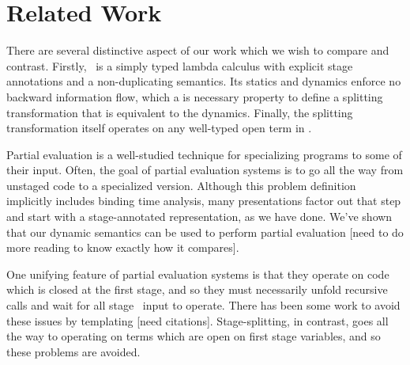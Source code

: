 
\section{Related Work}



There are several distinctive aspect of our work which we wish to compare and contrast.
Firstly, \lang\ is a simply typed lambda calculus 
with explicit stage annotations and a non-duplicating semantics.
Its statics and dynamics enforce no backward information flow,
which a is necessary property to define a splitting transformation
that is equivalent to the dynamics.
Finally, the splitting transformation itself operates on any well-typed open term in \lang.

Partial evaluation is a well-studied technique for specializing programs to some of their input.  
Often, the goal of partial evaluation systems is to go all the way from unstaged code to a specialized version.
Although this problem definition implicitly includes binding time analysis,
many presentations factor out that step and start with a stage-annotated representation, as we have done.
We've shown that our dynamic semantics can be used to perform partial evaluation 
[need to do more reading to know exactly how it compares].

One unifying feature of partial evaluation systems is that they operate on code which is closed at the first stage,
and so they must necessarily unfold recursive calls and wait for all stage \bbone\ input to operate.
There has been some work to avoid these issues by templating [need citations].
Stage-splitting, in contrast, goes all the way to operating on terms which are open on first stage variables,
and so these problems are avoided.


